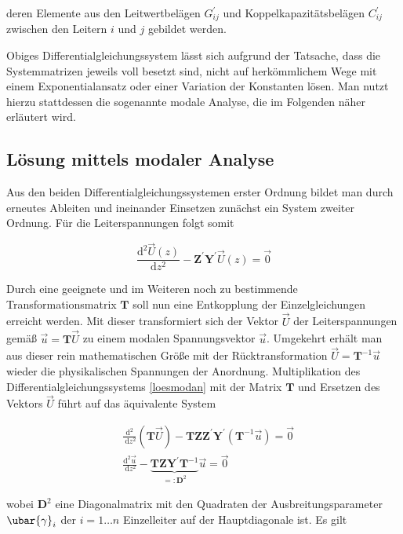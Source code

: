 deren Elemente aus den Leitwertbelägen $G_{i j}^{\prime}$ und Koppelkapazitätsbelägen $C_{i j}^{\prime}$ zwischen den Leitern $i$ und $j$ gebildet werden.

Obiges Differentialgleichungssystem lässt sich aufgrund der Tatsache, dass die Systemmatrizen jeweils voll besetzt sind, nicht auf herkömmlichem Wege mit einem Exponentialansatz oder einer Variation der Konstanten lösen. Man nutzt hierzu stattdessen die sogenannte modale Analyse, die im Folgenden näher erläutert wird.

\subsection{Lösung mittels modaler Analyse}
Aus den beiden Differentialgleichungssystemen erster Ordnung bildet man durch erneutes Ableiten und ineinander Einsetzen zunächst ein System zweiter Ordnung. Für die Leiterspannungen folgt somit


\begin{equation}\label{loesmodan}
	\frac{\mathrm{d}^{2} \vec{U}(z)}{\mathrm{d} z^{2}}-\mathbf{Z}^{\prime} \mathbf{Y}^{\prime} \vec{U}(z)=\overrightarrow{0} 
\end{equation}


Durch eine geeignete und im Weiteren noch zu bestimmende Transformationsmatrix $\mathbf{T}$ soll nun eine Entkopplung der Einzelgleichungen erreicht werden. Mit dieser transformiert sich der Vektor $\vec{U}$ der Leiterspannungen gemäß $\vec{u}=\mathbf{T} \vec{U}$ zu einem modalen Spannungsvektor $\vec{u}$. Umgekehrt erhält man aus dieser rein mathematischen Größe mit der Rücktransformation $\vec{U}=\mathbf{T}^{-1} \vec{u}$ wieder die physikalischen Spannungen der Anordnung. Multiplikation des Differentialgleichungssystems \ref{loesmodan} mit der Matrix $\mathbf{T}$ und Ersetzen des Vektors $\vec{U}$ führt auf das äquivalente System


\begin{align}
	& \frac{\mathrm{d}^{2}}{\mathrm{~d} z^{2}}(\mathbf{T} \vec{U})-\mathbf{T Z} \mathbf{Z}^{\prime} \mathbf{Y}^{\prime}\left(\mathbf{T}^{-1} \vec{u}\right)=\overrightarrow{0}  \\
	& \frac{\mathrm{d}^{2} \vec{u}}{\mathrm{~d} z^{2}}-\underbrace{\mathbf{T Z} \mathbf{Y}^{\prime} \mathbf{T}^{-1}}_{=: \mathbf{D}^{2}} \vec{u}=\overrightarrow{0} 
\end{align}


wobei $\mathbf{D}^{2}$ eine Diagonalmatrix mit den Quadraten der Ausbreitungsparameter $\ubar{\gamma}_{i}$ der $i=1 \ldots n$ Einzelleiter auf der Hauptdiagonale ist. Es gilt

